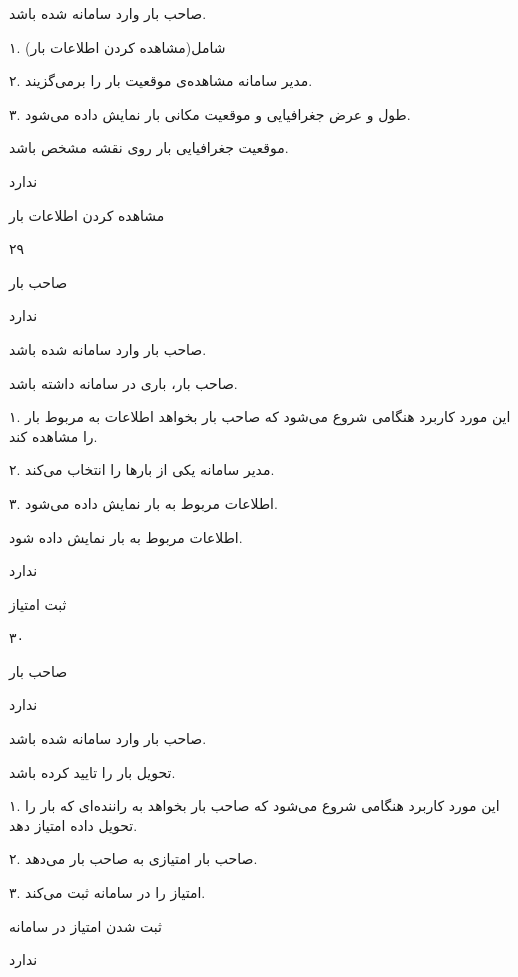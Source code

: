 صاحب بار وارد سامانه شده باشد.


۱. شامل(مشاهده کردن اطلاعات بار)

۲. مدیر سامانه مشاهده‌ی موقعیت بار را برمی‌گزیند.

۳. طول و عرض جغرافیایی و موقعیت مکانی بار نمایش داده می‌شود.

موقعیت جغرافیایی بار روی نقشه مشخص باشد.

ندارد

\newpage

مشاهده کردن اطلاعات بار

۲۹

صاحب بار

ندارد

صاحب بار وارد سامانه شده باشد.

صاحب بار، باری در سامانه داشته باشد.


۱. این مورد کاربرد هنگامی شروع می‌شود که صاحب بار بخواهد اطلاعات به مربوط بار را مشاهده کند.

۲. مدیر سامانه یکی از بارها را انتخاب می‌کند.

۳. اطلاعات مربوط به بار نمایش داده می‌شود.

اطلاعات مربوط به بار نمایش داده شود.

ندارد

\newpage

ثبت امتیاز

۳۰

صاحب بار

ندارد


صاحب بار وارد سامانه شده باشد.

تحویل بار را تایید کرده باشد.


 ۱. این مورد کاربرد هنگامی شروع می‌شود که صاحب بار بخواهد به راننده‌ای که بار را تحویل داده امتیاز دهد.

۲. صاحب بار امتیازی به صاحب بار می‌دهد.

۳. امتیاز را در سامانه ثبت می‌کند.

ثبت شدن امتیاز در سامانه

ندارد
